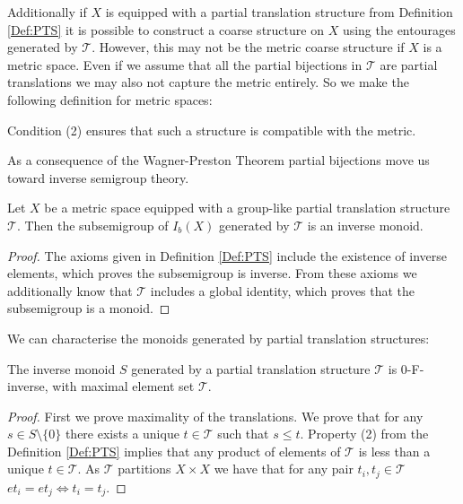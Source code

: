 \begin{corollary}
\begin{remark}
Additionally if $X$ is equipped with a partial translation structure from Definition \ref{Def:PTS} it is possible to construct a coarse structure on $X$ using the entourages generated by $\mathcal{T}$. However, this may not be the metric coarse structure if $X$ is a metric space. Even if we assume that all the partial bijections in $\mathcal{T}$ are partial translations we may also not capture the metric entirely. So we make the following definition for metric spaces:
\end{remark}


Condition (2) ensures that such a structure is compatible with the metric.

As a consequence of the Wagner-Preston Theorem \cite{MR1455373} partial bijections move us toward inverse semigroup theory.
\begin{proposition}\label{prop:P6}
Let $X$ be a metric space equipped with a group-like partial translation structure $\mathcal{T}$. Then the subsemigroup of $I_{b}(X)$ generated by $\mathcal{T}$ is an inverse monoid.
\end{proposition}
\begin{proof}
The axioms given in Definition \ref{Def:PTS} include the existence of inverse elements, which proves the subsemigroup is inverse. From these axioms we additionally know that $\mathcal{T}$ includes a global identity, which proves that the subsemigroup is a monoid.
\end{proof}

We can characterise the monoids generated by partial translation structures:

\begin{lemma}\label{Lem:PTS}
The inverse monoid $S$ generated by a partial translation structure $\mathcal{T}$ is 0-F-inverse, with maximal element set $\mathcal{T}$. 
\end{lemma}
\begin{proof}
First we prove maximality of the translations. We prove that for any $s\in S \setminus \lbrace 0 \rbrace$ there exists a unique $t \in \mathcal{T}$ such that $s \leq t$. Property (2) from the Definition \ref{Def:PTS} implies that any product of elements of $\mathcal{T}$ is less than a unique $t \in \mathcal{T}$. As $\mathcal{T}$ partitions $X \times X$ we have that for any pair $t_{i},t_{j}\in \mathcal{T}$ $et_{i}=et_{j} \Leftrightarrow t_{i}=t_{j}$. 


\end{proof}
\end{corollary}
